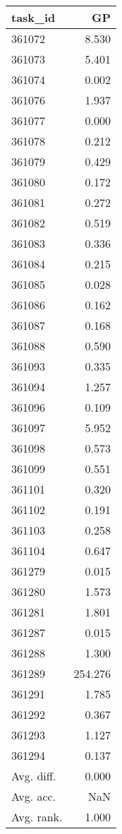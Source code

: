 \begin{tabular}{lr}
\toprule
task\_id & GP \\
\midrule
361072 & 8.530 \\
361073 & 5.401 \\
361074 & 0.002 \\
361076 & 1.937 \\
361077 & 0.000 \\
361078 & 0.212 \\
361079 & 0.429 \\
361080 & 0.172 \\
361081 & 0.272 \\
361082 & 0.519 \\
361083 & 0.336 \\
361084 & 0.215 \\
361085 & 0.028 \\
361086 & 0.162 \\
361087 & 0.168 \\
361088 & 0.590 \\
361093 & 0.335 \\
361094 & 1.257 \\
361096 & 0.109 \\
361097 & 5.952 \\
361098 & 0.573 \\
361099 & 0.551 \\
361101 & 0.320 \\
361102 & 0.191 \\
361103 & 0.258 \\
361104 & 0.647 \\
361279 & 0.015 \\
361280 & 1.573 \\
361281 & 1.801 \\
361287 & 0.015 \\
361288 & 1.300 \\
361289 & 254.276 \\
361291 & 1.785 \\
361292 & 0.367 \\
361293 & 1.127 \\
361294 & 0.137 \\
Avg. diff. & 0.000 \\
Avg. acc. & NaN \\
Avg. rank. & 1.000 \\
\bottomrule
\end{tabular}
